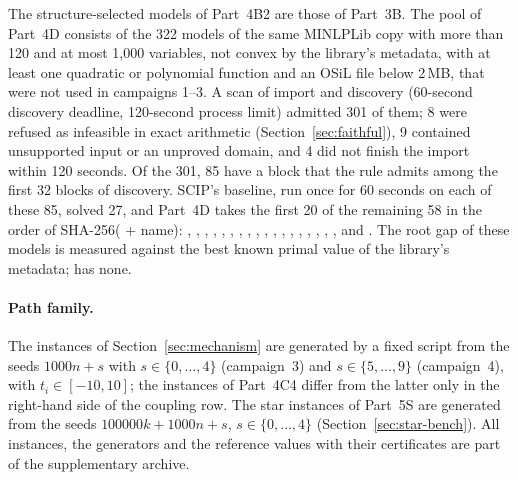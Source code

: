 \begin{sloppypar}
The structure-selected models of Part~4B2 are those of Part~3B. The pool of
Part~4D consists of the 322 models of the same MINLPLib copy with more than 120
and at most 1{,}000 variables, not convex by the library's metadata, with at
least one quadratic or polynomial function and an OSiL file below 2\,MB, that
were not used in campaigns 1--3. A scan of import and discovery (60-second
discovery deadline, 120-second process limit) admitted 301 of them; 8 were
refused as infeasible in exact arithmetic (Section~\ref{sec:faithful}), 9
contained unsupported input or an unproved domain, and 4 did not finish the
import within 120 seconds. Of the 301, 85 have a block that the 
rule admits among the first 32 blocks of discovery.
SCIP's baseline, run once for 60 seconds on each of these 85, solved 27, and
Part~4D takes the first 20 of the remaining 58 in the order of
SHA-256( + name): ,
, ,
, , ,
, , , ,
, , ,
, ,
, , ,
 and . The root gap of these models
is measured against the best known primal value of the library's metadata;
 has none.
\end{sloppypar}

\paragraph{Path family.} The instances of Section~\ref{sec:mechanism} are
generated by a fixed script from the seeds $1000n+s$ with $s\in\{0,\dots,4\}$
(campaign~3) and $s\in\{5,\dots,9\}$ (campaign~4), with $t_i\in[-10,10]$; the
instances of Part~4C4 differ from the latter only in the right-hand side of
the coupling row. The star instances of Part~5S are generated from the seeds
$100000k+1000n+s$, $s\in\{0,\dots,4\}$ (Section~\ref{sec:star-bench}). All
instances, the generators and the reference values with their certificates
are part of the supplementary archive.
